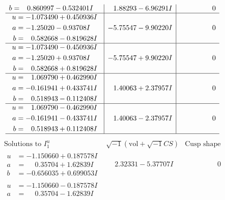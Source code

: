 \documentclass[1p]{elsarticle_modified}
\theoremstyle{definition}
\newcommand{\I}{\sqrt{-1}}
\begin{document}
$$\begin{array}{c|c|c}
\begin{aligned}
b &= \phantom{-}0.860997 - 0.532401 I\end{aligned}
 & \phantom{-}1.88293 - 6.96291 I & \phantom{-0.000000 } 0 \\ \hline\begin{aligned}
u &= -1.073490 + 0.450936 I \\
a &= -1.25020 - 0.93708 I \\
b &= \phantom{-}0.582668 - 0.819628 I\end{aligned}
 & -5.75547 - 9.90220 I & \phantom{-0.000000 } 0 \\ \hline\begin{aligned}
u &= -1.073490 - 0.450936 I \\
a &= -1.25020 + 0.93708 I \\
b &= \phantom{-}0.582668 + 0.819628 I\end{aligned}
 & -5.75547 + 9.90220 I & \phantom{-0.000000 } 0 \\ \hline\begin{aligned}
u &= \phantom{-}1.069790 + 0.462990 I \\
a &= -0.161941 + 0.433741 I \\
b &= \phantom{-}0.518943 - 0.112408 I\end{aligned}
 & \phantom{-}1.40063 + 2.37957 I & \phantom{-0.000000 } 0 \\ \hline\begin{aligned}
u &= \phantom{-}1.069790 - 0.462990 I \\
a &= -0.161941 - 0.433741 I \\
b &= \phantom{-}0.518943 + 0.112408 I\end{aligned}
 & \phantom{-}1.40063 - 2.37957 I & \phantom{-0.000000 } 0\\
 \hline 
 \end{array}$$\newpage$$\begin{array}{c|c|c}  
\text{Solutions to }I^u_{1}& \I (\text{vol} + \sqrt{-1}CS) & \text{Cusp shape}\\
 \hline 
\begin{aligned}
u &= -1.150660 + 0.187578 I \\
a &= \phantom{-}0.35704 + 1.62839 I \\
b &= -0.656035 + 0.699053 I\end{aligned}
 & \phantom{-}2.32331 - 5.37707 I & \phantom{-0.000000 } 0 \\ \hline\begin{aligned}
u &= -1.150660 - 0.187578 I \\
a &= \phantom{-}0.35704 - 1.62839 I \\

\end{aligned}
\end{array}$$
\end{document}
